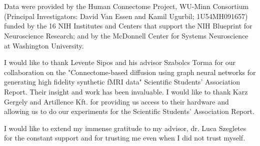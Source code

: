 \chapter*{\koszonetnyilvanitas}

Data were provided by the Human Connectome Project, WU-Minn Consortium (Principal Investigators: David Van Essen and Kamil Ugurbil; 1U54MH091657) funded by the 16 NIH Institutes and Centers that support the NIH Blueprint for Neuroscience Research; and by the McDonnell Center for Systems Neuroscience at Washington University.

I would like to thank Levente Sipos and his advisor Szabolcs Torma for our collaboration on the "Connectome-based diffusion using graph neural networks for generating high fidelity synthetic fMRI data" Scientific Students’ Association Report. Their insight and work has been invaluable. I would like to thank Karz Gergely and Artillence Kft. for providing us access to their hardware and allowing us to do our experiments for the Scientific Students’ Association Report.

I would like to extend my immense gratitude to my advisor, dr. Luca Szegletes for the constant support and for trusting me even when I did not trust myself.